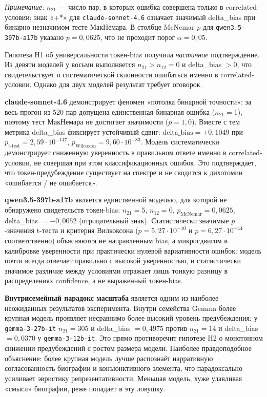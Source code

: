 \textit{Примечание:} $n_{21}$ --- число пар, в которых ошибка совершена только в correlated-условии; знак «+*» для \texttt{claude-sonnet-4.6} означает значимый delta\_bias при бинарно незначимом тесте МакНемара. В столбце McNemar $p$ для \texttt{qwen3.5-397b-a17b} указано $p = 0{,}0625$, что не проходит порог $\alpha = 0{,}05$.

Гипотеза H1 об универсальности токен-bias получила \textit{частичное} подтверждение. Из девяти моделей у восьми выполняется $n_{21} > n_{12} = 0$ и delta\_bias $> 0$, что свидетельствует о систематической склонности ошибаться именно в correlated-условии. Однако для двух моделей результат требует оговорок.

\textbf{claude-sonnet-4.6} демонстрирует феномен «потолка бинарной точности»: за весь прогон из 520 пар допущена единственная бинарная ошибка ($n_{21} = 1$), поэтому тест МакНемара не достигает значимости ($p = 1{,}0$). Вместе с тем метрика delta\_bias фиксирует устойчивый сдвиг: $\text{delta\_bias} = +0{,}1049$ при $p_{\text{t-test}} = 2{,}59 \cdot 10^{-147}$, $p_{\text{Wilcoxon}} = 9{,}60 \cdot 10^{-83}$. Модель систематически демонстрирует сниженную уверенность в правильном ответе именно в correlated-условии, не совершая при этом классификационных ошибок. Это подтверждает, что токен-предубеждение существует на спектре и не сводится к дихотомии «ошибается / не ошибается».

\textbf{qwen3.5-397b-a17b} является единственной моделью, для которой не обнаружено свидетельств токен-bias: $n_{21} = 5$, $n_{12} = 0$, $p_{\text{McNemar}} = 0{,}0625$, delta\_bias $= -0{,}0052$ (отрицательный знак). Статистически значимые $p$-значения t-теста и критерия Вилкоксона ($p = 5{,}27 \cdot 10^{-10}$ и $p = 6{,}27 \cdot 10^{-44}$ соответственно) объясняются не направленным bias, а микросдвигом в калибровке уверенности при практически нулевой вариативности ошибок: модель почти всегда отвечает правильно с высокой уверенностью, и статистически значимое различие между условиями отражает лишь тонкую разницу в распределениях confidence, а не выраженный токен-bias.

\textbf{Внутрисемейный парадокс масштаба} является одним из наиболее неожиданных результатов эксперимента. Внутри семейства Gemma более крупная модель проявляет несравнимо более высокий уровень предубеждения: у \texttt{gemma-3-27b-it} $n_{21} = 305$ и delta\_bias $= 0{,}4975$ против $n_{21} = 14$ и delta\_bias $= 0{,}0370$ у \texttt{gemma-3-12b-it}. Это прямо противоречит гипотезе H2 о монотонном снижении предубеждений с ростом размера модели. Наиболее правдоподобное объяснение: более крупная модель лучше распознаёт нарративную согласованность биографии и конъюнктивного элемента, что парадоксально усиливает эвристику репрезентативности. Меньшая модель, хуже улавливая «смысл» биографии, реже попадает в эту ловушку.

